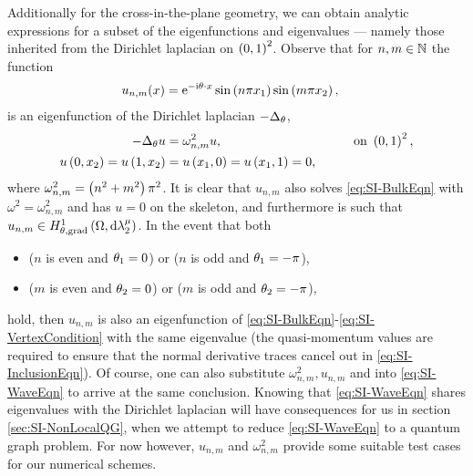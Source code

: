 Additionally for the cross-in-the-plane geometry, we can obtain analytic expressions for a subset of the eigenfunctions and eigenvalues --- namely those inherited from the Dirichlet laplacian on $\left( 0,1 \right)^2$.
Observe that for $n,m\in\mathbb{N}$ the function
\begin{align*}
	u_{n,m}(x) &= \mathrm{e}^{-\mathrm{i}\theta\cdot x}\sin\left( n\pi x_1 \right)\sin\left( m\pi x_2 \right),
\end{align*}
is an eigenfunction of the Dirichlet laplacian $-\Delta_{\theta}$,
\begin{align*}
	-\Delta_{\theta}u &= \omega_{n,m}^2 u, &\qquad \text{on } \left( 0,1 \right)^2, \\
	u\left( 0,x_2 \right) = u\left( 1,x_2 \right) &= u\left( x_1,0 \right) = u\left( x_1,1 \right) = 0,
\end{align*}
where $\omega_{n,m}^2 = \left( n^2+m^2 \right)\pi^2$.
It is clear that $u_{n,m}$ also solves \eqref{eq:SI-BulkEqn} with $\omega^2 = \omega_{n,m}^2$ and has $u=0$ on the skeleton, and furthermore is such that $u_{n,m}\in H^1_{\theta, \mathrm{grad}}\left( \Omega, \mathrm{d}\lambda_2^{\mu} \right)$.
In the event that both
\begin{itemize}
	\item ($n$ is even and $\theta_1=0$) or ($n$ is odd and $\theta_1=-\pi$),
	\item ($m$ is even and $\theta_2=0$) or ($m$ is odd and $\theta_2=-\pi$),
\end{itemize}
hold, then $u_{n,m}$ is also an eigenfunction of \eqref{eq:SI-BulkEqn}-\eqref{eq:SI-VertexCondition} with the same eigenvalue (the quasi-momentum values are required to ensure that the normal derivative traces cancel out in \eqref{eq:SI-InclusionEqn}).
Of course, one can also substitute $\omega^2_{n,m}, u_{n,m}$ and into \eqref{eq:SI-WaveEqn} to arrive at the same conclusion.
Knowing that \eqref{eq:SI-WaveEqn} shares eigenvalues with the Dirichlet laplacian will have consequences for us in section \ref{sec:SI-NonLocalQG}, when we attempt to reduce \eqref{eq:SI-WaveEqn} to a quantum graph problem.
For now however, $u_{n,m}$ and $\omega_{n,m}^2$ provide some suitable test cases for our numerical schemes.